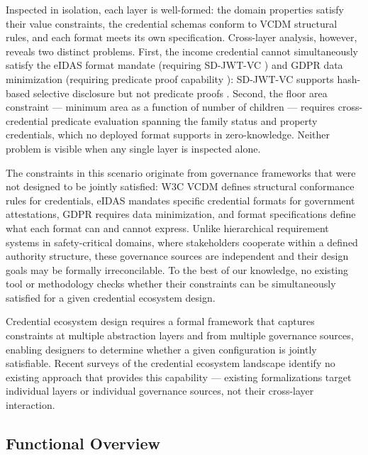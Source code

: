 Inspected in isolation, each layer is well-formed: the domain properties satisfy their value constraints, the credential schemas conform to VCDM structural rules, and each format meets its own specification. Cross-layer analysis, however, reveals two distinct problems. First, the income credential cannot simultaneously satisfy the eIDAS format mandate (requiring SD-JWT-VC \citep{noauthor_eu-digital-identity-walleteudi-doc-architecture-and-reference-framework_2026}) and GDPR data minimization (requiring predicate proof capability \citep{gdpr}): SD-JWT-VC supports hash-based selective disclosure but not predicate proofs \citep{terbu_sd-jwt-based_2026}. Second, the floor area constraint --- minimum area as a function of number of children --- requires cross-credential predicate evaluation spanning the family status and property credentials, which no deployed format supports in zero-knowledge. Neither problem is visible when any single layer is inspected alone.

The constraints in this scenario originate from governance frameworks that were not designed to be jointly satisfied: W3C VCDM \citep{manu_verifiable_2025} defines structural conformance rules for credentials, eIDAS \citep{noauthor_eu-digital-identity-walleteudi-doc-architecture-and-reference-framework_2026} mandates specific credential formats for government attestations, GDPR \citep{gdpr} requires data minimization, and format specifications \citep{terbu_sd-jwt-based_2026} \citep{curran2022anoncreds} define what each format can and cannot express. Unlike hierarchical requirement systems in safety-critical domains, where stakeholders cooperate within a defined authority structure, these governance sources are independent and their design goals may be formally irreconcilable. To the best of our knowledge, no existing tool or methodology checks whether their constraints can be simultaneously satisfied for a given credential ecosystem design.

Credential ecosystem design requires a formal framework that captures constraints at multiple abstraction layers and from multiple governance sources, enabling designers to determine whether a given configuration is jointly satisfiable. Recent surveys of the credential ecosystem landscape \citep{mazzocca_survey_2025, naghmouchi_systematic_2025} identify no existing approach that provides this capability --- existing formalizations target individual layers or individual governance sources, not their cross-layer interaction.

\subsection{Functional Overview}\label{functional-overview}

